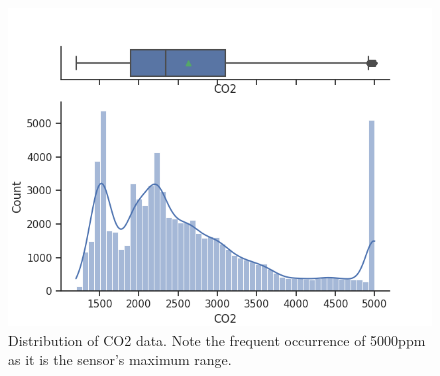 \documentclass[conference]{IEEEtran}
\begin{document}
\begin{figure}[htbp]
\begin{center}
\includegraphics[width=1\linewidth]{figs/CO2.png}
\caption{Distribution of CO2 data. Note the frequent occurrence of 5000ppm as it is the sensor's maximum range.}
\label{fig:co2}
\end{center}
\end{figure}
\end{document}
